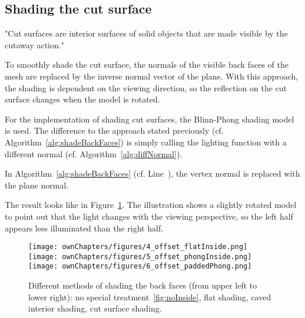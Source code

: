 \subsection{Shading the cut surface}
\label{chap:cutSurface}
"Cut surfaces are interior surfaces of solid objects that are made visible by the cutaway action."~\cite{jour:adaptiveCutaways}

To smoothly shade the cut surface, the normals of the visible back faces of the mesh are replaced by the inverse normal vector of the plane. With this approach, the shading is dependent on the viewing direction, so the reflection on the cut surface changes when the model is rotated.

For the implementation of shading cut surfaces, the Blinn-Phong shading model is used. The difference to the approach stated previously (cf. Algorithm~\ref{alg:shadeBackFaces}) is simply calling the lighting function with a different normal (cf. Algorithm~\ref{alg:diffNormal}).
\begin{algorithm}
\;
\BlankLine
\caption{In Algorithm~\ref{alg:shadeBackFaces} (cf. Line~\NlSty{\ref{ln:normVN}}), the vertex normal is replaced with the plane normal.}
\label{alg:diffNormal}
\end{algorithm}

The result looks like in Figure~\ref{fig:shading}. The illustration shows a slightly rotated model to point out that the light changes with the viewing perspective, so the left half appears less illuminated than the right half.

\begin{figure}%
\centering
{}%
\hspace{7.00mm}
\texttt{[image: ownChapters/figures/4\_offset\_flatInside.png]}%
\hspace{7.00mm}
\texttt{[image: ownChapters/figures/5\_offset\_phongInside.png]}%
\hspace{7.00mm}
\texttt{[image: ownChapters/figures/6\_offset\_paddedPhong.png]}%
\caption{Different methods of shading the back faces (from upper left to lower right): no special treatment~\ref{fig:noInside}, flat shading, caved interior shading, cut surface shading.}%
\label{fig:shading}%
\end{figure}